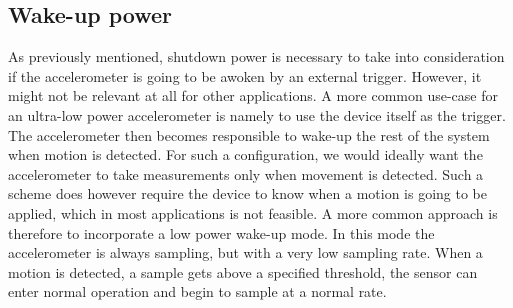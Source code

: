 
\subsection{Wake-up power}

As previously mentioned, shutdown power is necessary to take into consideration if the accelerometer is going to be awoken by an external trigger. However, it might not be relevant at all for other applications. A more common use-case for an ultra-low power accelerometer is namely to use the device itself as the trigger. The accelerometer then becomes responsible to wake-up the rest of the system when motion is detected. For such a configuration, we would ideally want the accelerometer to take measurements only when movement is detected. Such a scheme does however require the device to know when a motion is going to be applied, which in most applications is not feasible. A more common approach is therefore to incorporate a low power wake-up mode. In this mode the accelerometer is always sampling, but with a very low sampling rate. When a motion is detected, a sample gets above a specified threshold, the sensor can enter normal operation and begin to sample at a normal rate. 

